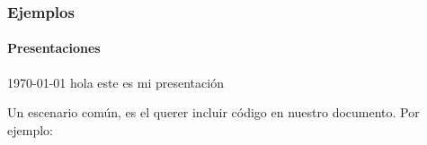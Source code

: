 \documentclass{beamer}
\begin{document}
\begin{frame}[containsverbatim]
\frametitle{Ejemplos}
\framesubtitle{Presentaciones}

\today{}
hola este es mi presentación
\end{frame}

\begin{frame}
Un escenario común, es el querer incluir código en nuestro documento. Por
ejemplo:

\end{frame}
\end{document}
